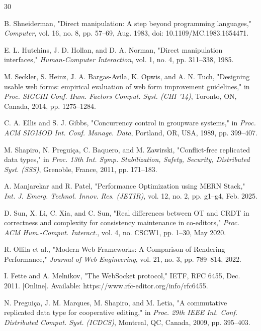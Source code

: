\begin{thebibliography}{30}

B. Shneiderman, "Direct manipulation: A step beyond programming languages," \textit{Computer}, vol. 16, no. 8, pp. 57--69, Aug. 1983, doi: 10.1109/MC.1983.1654471.

E. L. Hutchins, J. D. Hollan, and D. A. Norman, "Direct manipulation interfaces," \textit{Human-Computer Interaction}, vol. 1, no. 4, pp. 311--338, 1985.

M. Seckler, S. Heinz, J. A. Bargas-Avila, K. Opwis, and A. N. Tuch, "Designing usable web forms: empirical evaluation of web form improvement guidelines," in \textit{Proc. SIGCHI Conf. Hum. Factors Comput. Syst. (CHI ’14)}, Toronto, ON, Canada, 2014, pp. 1275--1284.

C. A. Ellis and S. J. Gibbs, "Concurrency control in groupware systems," in \textit{Proc. ACM SIGMOD Int. Conf. Manage. Data}, Portland, OR, USA, 1989, pp. 399--407.

M. Shapiro, N. Preguiça, C. Baquero, and M. Zawirski, "Conflict-free replicated data types," in \textit{Proc. 13th Int. Symp. Stabilization, Safety, Security, Distributed Syst. (SSS)}, Grenoble, France, 2011, pp. 171--183.

A. Manjarekar and R. Patel, "Performance Optimization using MERN Stack," \textit{Int. J. Emerg. Technol. Innov. Res. (JETIR)}, vol. 12, no. 2, pp. g1--g4, Feb. 2025.

D. Sun, X. Li, C. Xia, and C. Sun, "Real differences between OT and CRDT in correctness and complexity for consistency maintenance in co-editors," \textit{Proc. ACM Hum.-Comput. Interact.}, vol. 4, no. CSCW1, pp. 1--30, May 2020.

R. Ollila et al., "Modern Web Frameworks: A Comparison of Rendering Performance," \textit{Journal of Web Engineering}, vol. 21, no. 3, pp. 789--814, 2022.

I. Fette and A. Melnikov, "The WebSocket protocol," IETF, RFC 6455, Dec. 2011. [Online]. Available: https://www.rfc-editor.org/info/rfc6455.

N. Preguiça, J. M. Marques, M. Shapiro, and M. Letia, "A commutative replicated data type for cooperative editing," in \textit{Proc. 29th IEEE Int. Conf. Distributed Comput. Syst. (ICDCS)}, Montreal, QC, Canada, 2009, pp. 395--403.


\end{thebibliography}
